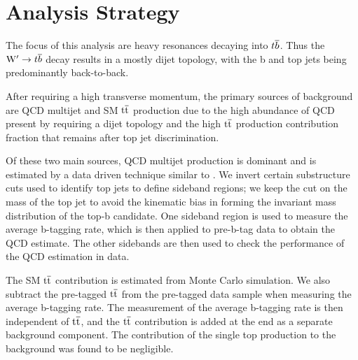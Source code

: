 \chapter{Analysis Strategy}
\label{sec:analysisStrategy}


The focus of this analysis are heavy resonances decaying into
${t\overline{b}}$.  Thus the $\mathrm{W}^\prime \to {t\overline{b}}$ decay results in a mostly
dijet topology, with the b and top jets being  predominantly back-to-back. 

After requiring a high transverse momentum, 
the primary sources of background are QCD multijet and SM $\mathrm{t\overline{t}}$ 
production due to the high abundance of QCD present by requiring a dijet topology and the high $\mathrm{t\overline{t}}$ production contribution fraction that remains after top jet discrimination. 

Of these two main sources, QCD multijet production is dominant and is estimated by a data driven technique similar 
to \cite{7tevZprime}.  We
invert certain substructure cuts used to identify top jets
to define sideband regions; we keep the cut on the mass of the
top jet to avoid the kinematic bias in forming the invariant mass
distribution of the top-b candidate.  One sideband region is used
to measure the average b-tagging rate, which is then applied to
pre-b-tag data to obtain the QCD estimate.  The other sidebands are
then used to check the performance of the QCD estimation in data.

The SM $\mathrm{t\overline{t}}$ contribution is estimated from Monte Carlo simulation.
We also subtract the pre-tagged $\mathrm{t\overline{t}}$ from the pre-tagged data sample when
measuring the average b-tagging rate.  The measurement
of the average b-tagging rate is then independent of $\mathrm{t\overline{t}}$, and the 
$\mathrm{t\overline{t}}$ contribution is added at the end as a separate background
component.
The contribution of the single top production to the background was
found to be negligible.

